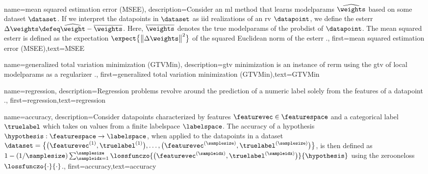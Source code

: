 {{
{name={mean squared estimation error (MSEE)},
	description={Consider an \gls{ml} method that 
		learns \gls{modelparams} $\widehat{\weights}$ based on some \gls{dataset} $\dataset$. 
		If we interpret the \gls{datapoint}s in $\dataset$ as \gls{iid} \gls{realization}s of an \gls{rv} $\datapoint$, 
		we define the \gls{esterr} $\Delta \weights \defeq \widehat{\weight} - \overline{\weights}$. 
		Here, $\overline{\weights}$ denotes the true \gls{modelparams} of the \gls{probdist} 
		of $\datapoint$. The \gls{mean} squared \gls{esterr} is 
		defined as the \gls{expectation} $\expect \big\{ \big\| \Delta \weights \big\|^{2} \big\}$ of the 
		squared Euclidean \gls{norm} of the \gls{esterr} \cite{LC,kay}.},
	first={mean squared estimation error (MSEE)},text={MSEE} 
}

{name={generalized total variation minimization (GTVMin)},
	description={\gls{gtv} minimization is an instance of \gls{rerm} 
		using the \gls{gtv} of local \gls{modelparams} as a \gls{regularizer} \cite{ClusteredFLTVMinTSP}.},
	first={generalized total variation minimization (GTVMin)},text={GTVMin} 
}

{name={regression},
	description={Regression problems revolve around the 
		prediction of a numeric \gls{label} solely from the \gls{feature}s of a \gls{datapoint} \cite[Ch. 2]{MLBasics}.},
	first={regression},text={regression} 
}

{name={accuracy},
	description={Consider \gls{datapoint}s characterized by \gls{feature}s $\featurevec \in \featurespace$ and 
		a categorical label $\truelabel$ which takes on values from a finite \gls{labelspace} $\labelspace$. The 
		accuracy of a \gls{hypothesis} $\hypothesis: \featurespace \rightarrow \labelspace$, when applied 
		to the \gls{datapoint}s in a \gls{dataset} $\dataset = \big\{ \big(\featurevec^{(1)}, \truelabel^{(1)} \big), \ldots, \big(\featurevec^{(\samplesize)},\truelabel^{(\samplesize)}\big) \big\}$, 
		is then defined as $1 - (1/\samplesize)\sum_{\sampleidx=1}^{\samplesize} \lossfunczo{\big(\featurevec^{(\sampleidx)},\truelabel^{(\sampleidx)}\big)}{\hypothesis}$ using the \gls{zerooneloss} $\lossfunczo{\cdot}{\cdot}$.},
	first={accuracy},text={accuracy} 
}





}}
